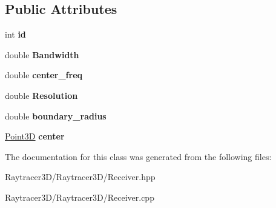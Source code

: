 \subsection*{Public Attributes}
\begin{DoxyCompactItemize}
\item 
\hypertarget{class_receiver_aaadfb4436bd66669d03811c846985843}{}\label{class_receiver_aaadfb4436bd66669d03811c846985843} 
int {\bfseries id}
\item 
\hypertarget{class_receiver_a19225a5d1c7c5f4cdaa36b99a1184d26}{}\label{class_receiver_a19225a5d1c7c5f4cdaa36b99a1184d26} 
double {\bfseries Bandwidth}
\item 
\hypertarget{class_receiver_a33f4396a9edddf6fe298108ffa12da58}{}\label{class_receiver_a33f4396a9edddf6fe298108ffa12da58} 
double {\bfseries center\+\_\+freq}
\item 
\hypertarget{class_receiver_a7cf7efbe8c86d8f585e744cbba86c267}{}\label{class_receiver_a7cf7efbe8c86d8f585e744cbba86c267} 
double {\bfseries Resolution}
\item 
\hypertarget{class_receiver_ad9a009e1e386791e5c3bd7211d83a3f9}{}\label{class_receiver_ad9a009e1e386791e5c3bd7211d83a3f9} 
double {\bfseries boundary\+\_\+radius}
\item 
\hypertarget{class_receiver_a4432a9eafa52a2483918d2d3119cb597}{}\label{class_receiver_a4432a9eafa52a2483918d2d3119cb597} 
\hyperlink{class_point3_d}{Point3D} {\bfseries center}
\end{DoxyCompactItemize}


The documentation for this class was generated from the following files\+:\begin{DoxyCompactItemize}
\item 
Raytracer3\+D/\+Raytracer3\+D/Receiver.\+hpp\item 
Raytracer3\+D/\+Raytracer3\+D/Receiver.\+cpp\end{DoxyCompactItemize}
